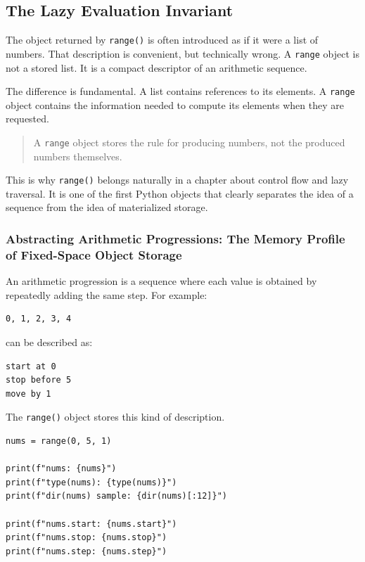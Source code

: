 \documentclass[a4paper,twoside]{report}
\begin{document}
\subsection{The Lazy Evaluation Invariant}

The object returned by \texttt{range()} is often introduced as if it were a list of numbers. That description is convenient, but technically wrong. A \texttt{range} object is not a stored list. It is a compact descriptor of an arithmetic sequence.

The difference is fundamental. A list contains references to its elements. A \texttt{range} object contains the information needed to compute its elements when they are requested.

\begin{quote}
A \texttt{range} object stores the rule for producing numbers, not the produced numbers themselves.
\end{quote}

This is why \texttt{range()} belongs naturally in a chapter about control flow and lazy traversal. It is one of the first Python objects that clearly separates the idea of a sequence from the idea of materialized storage.

\subsubsection{Abstracting Arithmetic Progressions: The Memory Profile of Fixed-Space Object Storage}

An arithmetic progression is a sequence where each value is obtained by repeatedly adding the same step. For example:

\begin{verbatim}
0, 1, 2, 3, 4
\end{verbatim}

can be described as:

\begin{verbatim}
start at 0
stop before 5
move by 1
\end{verbatim}

The \texttt{range()} object stores this kind of description.

\begin{verbatim}
nums = range(0, 5, 1)

print(f"nums: {nums}")
print(f"type(nums): {type(nums)}")
print(f"dir(nums) sample: {dir(nums)[:12]}")

print(f"nums.start: {nums.start}")
print(f"nums.stop: {nums.stop}")
print(f"nums.step: {nums.step}")
\end{verbatim}
\end{document}
